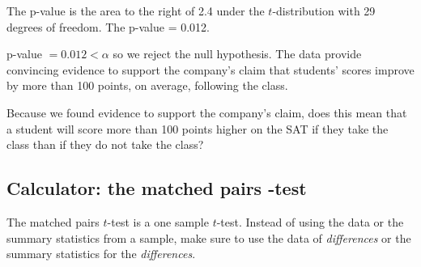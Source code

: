 \begin{examplewrap}
\begin{nexample}
\begin{description}
The p-value is the area to the right of 2.4 under the $t$-distribution with 29 degrees of freedom.  The p-value = 0.012.

\item[\inferencestep{Conclude}]  p-value $=0.012<\alpha$ so we reject the null hypothesis. The data provide convincing evidence to support the company's claim that students' scores improve by more than 100 points, on average, following the class.


\end{description}
\end{nexample}
\end{examplewrap}


\begin{exercisewrap}
\begin{nexercise}
Because we found evidence to support the company's claim, does this mean that a student will score more than 100 points higher on the SAT if they take the class than if they do not take the class?  


\end{nexercise}
\end{exercisewrap}


\D{\newpage}

\subsection[Calculator: the matched pairs $t$-test]{Calculator: the matched pairs -test}
The matched pairs $t$-test is a one sample $t$-test. Instead of using the data or the summary statistics from a sample, make sure to use the data of \emph{differences} or the summary statistics for the \emph{differences}.
\label{matchedpairsttest}

